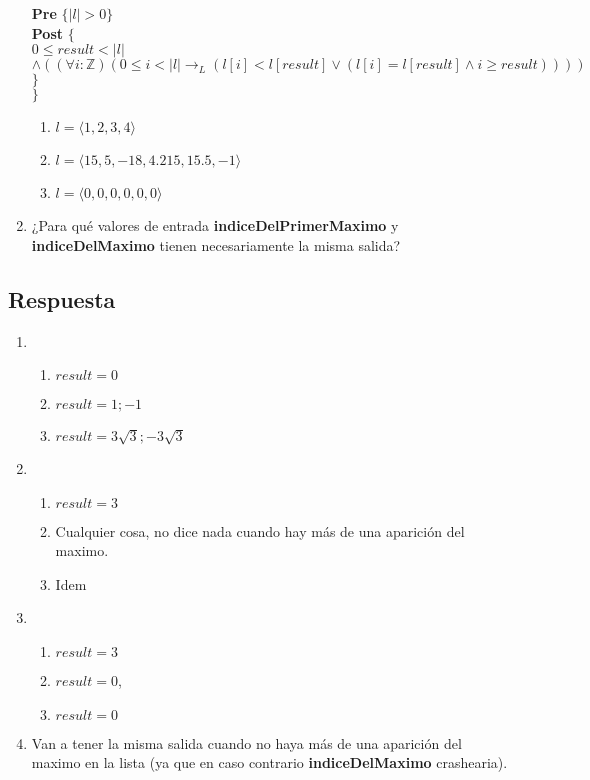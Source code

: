 \documentclass[a4paper]{article}
\begin{document}
\begin{enumerate}[label=\alph*)]
			\hspace*{6mm} \textbf{Pre }$\{ |l| > 0\}$\smallskip \\
			\hspace*{6mm} \textbf{Post }$\{$\\
			\hspace*{6mm} $0\leq result < |l|$\\
			\hspace*{6mm} $\wedge ((\forall i :\mathbb{Z})(0 \leq i < |l|\rightarrow_L (l[i] < l[result] \vee (l[i]=l[result]\wedge i \geq result))))$\\
			\hspace*{6mm}$\}$\\
			$\}$
			\begin{enumerate}[label=\Roman*)]
				\item $l=\langle 1,2,3,4\rangle$
				\item $l=\langle 15,5,-18,4.215,15.5,-1\rangle$
				\item $l=\langle 0,0,0,0,0,0\rangle$
			\end{enumerate}
		\item  ¿Para qué valores de entrada \textbf{indiceDelPrimerMaximo} y \textbf{indiceDelMaximo} tienen necesariamente la misma salida?
	\end{enumerate}
\subsection*{Respuesta}
	\begin{enumerate}[label=\alph*)]
		\item
			\begin{enumerate}[label=\Roman*)]
				\item $result=0$
				\item $result=1;-1$
				\item $result=3\sqrt{3};-3\sqrt{3}$
			\end{enumerate}
		\item
			\begin{enumerate}[label=\Roman*)]
				\item $result=3$
				\item Cualquier cosa, no dice nada cuando hay más de una aparición
						del maximo.
				\item Idem
			\end{enumerate}
		\item
			\begin{enumerate}[label=\Roman*)]
				\item $result=3$
				\item $result=0$, 
				\item $result=0$
			\end{enumerate}
		\item Van a tener la misma salida cuando no haya más de una aparición del maximo en la lista (ya que en caso contrario \textbf{indiceDelMaximo} crashearia).
	\end{enumerate}
	
\end{document}
